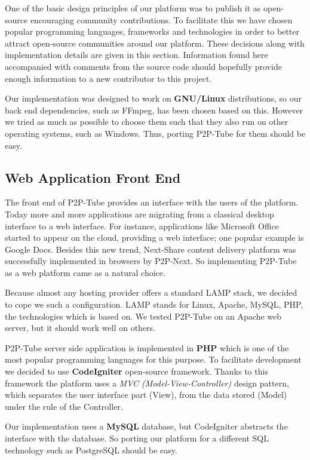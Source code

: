 One of the basic design principles of our platform was to publish it as open-source encouraging community contributions. To facilitate this we have chosen popular programming languages, frameworks and technologies in order to better attract open-source communities around our platform. These decisions along with implementation details are given in this section. Information found here accompanied with comments from the source code should hopefully provide enough information to a new contributor to this project.

Our implementation was designed to work on \textbf{GNU/Linux} distributions, so our back end dependencies, such as FFmpeg, has been chosen based on this. However we tried as much as possible to choose them such that they also run on other operating systems, such as Windows. Thus, porting P2P-Tube for them should be easy.

\subsection{Web Application Front End}
\label{subsec:front-end}

The front end of P2P-Tube provides an interface with the users of the platform. Today more and more applications are migrating from a classical desktop interface to a web interface. For instance, applications like Microsoft Office started to appear on the cloud, providing a web interface; one popular example is Google Docs. Besides this new trend, Next-Share content delivery platform was successfully implemented in browsers by P2P-Next. So implementing P2P-Tube as a web platform came as a natural choice.

Because almost any hosting provider offers a standard LAMP stack, we decided to cope we such a configuration. LAMP stands for Linux, Apache, MySQL, PHP, the technologies which is based on. We tested P2P-Tube on an Apache web server, but it should work well on others.

P2P-Tube server side application is implemented in \textbf{PHP} which is one of the most popular programming languages for this purpose. To facilitate development we decided to use \textbf{CodeIgniter} \cite{code-igniter} open-source framework. Thanks to this framework the platform uses a \textit{MVC (Model-View-Controller)} design pattern, which separates the user interface part (View), from the data stored (Model) under the rule of the Controller.

Our implementation uses a \textbf{MySQL} database, but CodeIgniter abstracts the interface with the database. So porting our platform for a different SQL technology such as PostgreSQL should be easy.

